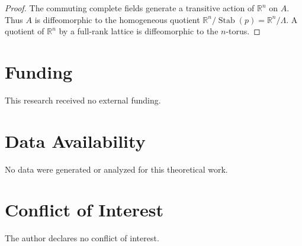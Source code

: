 \documentclass[11pt]{article}
\newcommand{\R}{\mathbb{R}}
\newcommand{\Stab}{\operatorname{Stab}}
\begin{document}
\begin{proof}
The commuting complete fields generate a transitive action of $\R^n$ on $A$.
Thus $A$ is diffeomorphic to the homogeneous quotient
$\R^n/\Stab(p)=\R^n/\Lambda$. A quotient of $\R^n$ by a full-rank lattice is
diffeomorphic to the $n$-torus.
\end{proof}

\section*{Funding}

This research received no external funding.

\section*{Data Availability}

No data were generated or analyzed for this theoretical work.

\section*{Conflict of Interest}

The author declares no conflict of interest.
\end{document}
